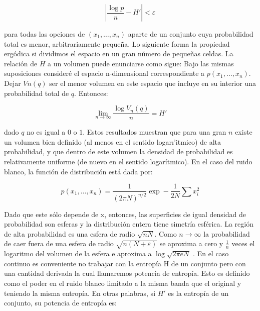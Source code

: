 \begin{equation}
\left | \frac{\log p}{n} - {H}'\right |< \varepsilon 
\end{equation}

para todas las opciones de $\left ( x_{1},\dots ,x_{n} \right )$ aparte de un conjunto cuya probabilidad total es menor, arbitrariamente peque\~na. Lo siguiente forma la propiedad erg\'odica si dividimos el espacio en un gran n\'umero de peque\~nas celdas. La relaci\'on de $H$ a un volumen puede enunciarse como sigue: Bajo las mismas suposiciones consider\'e el espacio n-dimensional correspondiente a $p\left ( x_{1},\dots ,x_{n} \right )$. Dejar $Vn\left ( 	q \right )$ ser el menor volumen en este espacio que incluye en su interior una probabilidad total de $q$. Entonces:

\begin{equation}
\lim_{n\rightarrow \infty }\frac{\log V_{n}\left ( q \right )}{n}={H}'
\end{equation}

dado $q$ no es igual a $0$ o $1$.\newline
Estos resultados muestran que para una gran $n$ existe un volumen bien definido (al menos en el sentido logar\i'itmico) de alta probabilidad, y que dentro de este volumen la densidad de probabilidad es relativamente uniforme (de nuevo en el sentido logar\'itmico).\newline
En el caso del ruido blanco, la funci\'on de distribuci\'on est\'a dada por:

\begin{equation}
p\left ( x_{1}, \ldots ,x_{n}\right )=\frac{1}{\left ( 2\pi N \right )^{n/2}}\exp -\frac{1}{2N}\sum x_{i}^{2}
\end{equation}

Dado que este s\'olo depende de x, entonces, las superficies de igual densidad de probabilidad son esferas y la distribuci\'on entera tiene simetr\'ia esf\'erica. La regi\'on de alta probabilidad es una esfera de radio $\sqrt{nN}$. Como $n\rightarrow \infty $ la probabilidad de caer fuera de una esfera de radio $\sqrt{n\left ( N+\varepsilon  \right )}$ se aproxima a cero y $\frac{1}{n}$ veces el logaritmo del volumen de la esfera e aproxima a $\log \sqrt{2\pi eN}$ .
En el caso continuo es conveniente no trabajar con la entrop\'ia H de un conjunto pero con una cantidad derivada la cual llamaremos potencia de entrop\'ia. Esto es definido como el poder en el ruido blanco limitado a la misma banda que el original y teniendo la misma entrop\'ia. En otras palabras, si ${H}'$ es la entrop\'ia de un conjunto, su potencia de entrop\'ia es:

